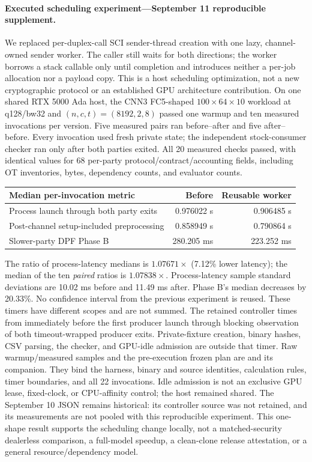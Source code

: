 \documentclass[11pt]{article}
\begin{document}
\paragraph{Executed scheduling experiment---September 11 reproducible supplement.}
\label{sec:worker-review}
We replaced per-duplex-call SCI sender-thread creation with one lazy,
channel-owned sender worker. The caller still waits for both directions;
the worker borrows a stack callable only until completion and introduces
neither a per-job allocation nor a payload copy. This is a host scheduling
optimization, not a new cryptographic protocol or an established GPU
architecture contribution.
On one shared RTX 5000 Ada host, the CNN3 FC5-shaped
$100\times64\times10$ workload at q128/bw32 and $(n,c,t)=(8192,2,8)$
passed one warmup and ten measured invocations per version. Five measured
pairs ran before--after and five after--before. Every invocation used fresh
private state; the independent stock-consumer checker ran only after both
parties exited. All 20 measured checks passed, with identical values for
68 per-party protocol/contract/accounting fields, including OT inventories,
bytes, dependency counts, and evaluator counts.
\begin{center}
\begin{tabular}{lrr}
\toprule
Median per-invocation metric & Before & Reusable worker \\
\midrule
Process launch through both party exits & 0.976022 s & 0.906485 s \\
Post-channel setup-included preprocessing & 0.858949 s & 0.790864 s \\
Slower-party DPF Phase B & 280.205 ms & 223.252 ms \\
\bottomrule
\end{tabular}
\end{center}
The ratio of process-latency medians is $1.07671\times$ (7.12\% lower
latency); the median of the ten \emph{paired} ratios is $1.07838\times$.
Process-latency sample standard deviations are 10.02 ms before and
11.49 ms after. Phase B's median decreases by 20.33\%.
No confidence interval from the previous experiment is reused.
These timers have different scopes and are not summed.
The retained  controller times
from immediately before the first producer launch through blocking
observation of both timeout-wrapped producer exits. Private-fixture creation,
binary hashes, CSV parsing, the checker, and GPU-idle admission are outside
that timer. Raw warmup/measured samples and the pre-execution frozen plan
are 
and its  companion. They bind the harness, binary and source
identities, calculation rules, timer boundaries, and all 22 invocations.
Idle admission is not an exclusive GPU lease, fixed-clock, or CPU-affinity
control; the host remained shared. The September 10 JSON remains historical:
its controller source was not retained, and its measurements are not pooled
with this reproducible experiment.
This one-shape result supports the scheduling change locally, not a
matched-security dealerless comparison, a full-model speedup, a clean-clone
release attestation, or a general resource/dependency model.
\end{document}
